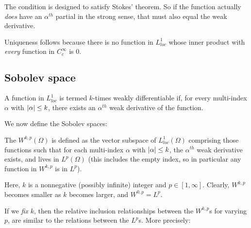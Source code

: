 \documentclass[a4paper]{amsart}
\begin{document}
The condition is designed to satisfy Stokes' theorem. So if the
function actually {\em does} have an $\alpha^{th}$ partial in the
strong sense, that must also equal the weak derivative.

Uniqueness follows because there is no function in $L^1_{loc}$ whose
inner product with {\em every} function in $C_c^\infty$ is $0$.

\subsection{Sobolev space}

\begin{definer}
  A function in $L^1_{loc}$ is termed $k$-times weakly differentiable
  if, for every multi-index $\alpha$ with $\left|\alpha\right| \le k$, there
  exists an $\alpha^{th}$ weak derivative of the function.
\end{definer}

We now define the Sobolev spaces:

\begin{definer}
  The  $W^{k,p}(\Omega)$ is defined as the
  vector subspace of $L^1_{loc}(\Omega)$ comprising those functions
  such that for each multi-index $\alpha$ with $\left|\alpha\right| \le k$,
  the $\alpha^{th}$ weak derivative exists, and lives in $L^p(\Omega)$
  (this includes the empty index, so in particular any function in
  $W^{k,p}$ is in $L^p$).
\end{definer}

Here, $k$ is a nonnegative (possibly infinite) integer and $p \in
[1,\infty]$. Clearly, $W^{k,p}$ becomes smaller as $k$ becomes larger,
and $W^{0,p} = L^p$.

If we {\em fix} $k$, then the relative inclusion relationships between
the $W^{k,p}$s for varying $p$, are similar to the relations between
the $L^p$s. More precisely:
\end{document}
